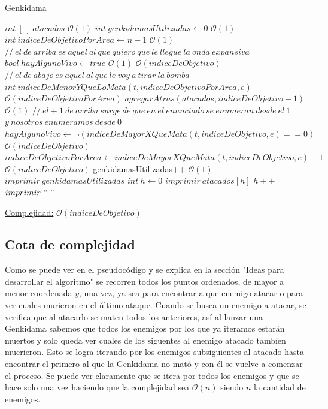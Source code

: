 \documentclass[10pt,a4paper]{article}
\begin{document}
\begin{algorithm}
\caption{Genkidama}
\begin{algorithmic}
  	\State $int~[~]~ atacados$ \Comment $\mathcal{O}(1)$
  	\State $int ~genkidamasUtilizadas \gets 0$ \Comment $\mathcal{O}(1)$
	\State $int ~indiceDeObjetivoPorArea \gets n - 1$ \Comment $\mathcal{O}(1)$
	\State $ //~el~ de~ arriba~ es~ aquel~ al~ que~ quiero~ que~ le~ llegue~ la~ onda~ expansiva$
	\State $bool ~hayAlgunoVivo \gets true$ \Comment $\mathcal{O}(1)$
	 \Comment $\mathcal{O}(indiceDeObjetivo)$
		\State $ 	//~el~ de~ abajo ~es~ aquel~ al~ que~ le~ voy~ a ~tirar~ la~ bomba$
		\State $int~indiceDeMenorYQueLoMata(t, indiceDeObjetivoPorArea, e)$ \Comment $\mathcal{O}(indiceDeObjetivoPorArea)$
		\State $agregarAtras(atacados, indiceDeObjetivo + 1)$ \Comment $\mathcal{O}(1)$
		\State $		//~el +1 ~de~ arriba~ surge~ de~ que~ en~ el~ enunciado ~se~ enumeran~ desde~ el~ 1 ~$
		\State $	   y~ nosotros~ enumeramos~ desde~ 0$
		\State $hayAlgunoVivo \gets \neg(indiceDeMayorXQueMata(t, indiceDeObjetivo, e) == 0)$ \Comment $\mathcal{O}(indiceDeObjetivo)$
		\State $indiceDeObjetivoPorArea \gets indiceDeMayorXQueMata(t, indiceDeObjetivo, e) - 1$ \Comment $\mathcal{O}(indiceDeObjetivo)$
		\State genkidamasUtilizadas++ \Comment $\mathcal{O}(1)$
	\EndWhile
	\State $imprimir ~genkidamasUtilizadas$
	\State $int~ h \gets 0$
			\State $imprimir ~atacados[h]$
			\State $h++$
					\State $imprimir ~"~"~$
			\EndIf
	\EndWhile
\EndFunction
\end{algorithmic}
\underline{Complejidad:} $\mathcal{O}(indiceDeObjetivo)$\\
    
\end{algorithm}

\newpage

\subsection{Cota de complejidad}
Como se puede ver en el pseudocódigo y se explica en la sección "Ideas para desarrollar el algoritmo" se recorren todos los puntos ordenados, de mayor a menor coordenada $y$, una vez, ya sea para encontrar a que enemigo atacar o para ver cuales murieron en el último ataque.
Cuando se busca un enemigo a atacar, se verifica que al atacarlo se maten todos los anteriores, así al lanzar una Genkidama sabemos que todos los enemigos por los que ya iteramos estarán muertos y solo queda ver cuales de los siguentes al enemigo atacado tambíen muerieron. Esto se logra iterando por los enemigos subsiguientes al atacado hasta encontrar el primero al que la Genkidama no mató y con él se vuelve a comenzar el proceso. Se puede ver claramente que se itera por todos los enemigos y que se hace solo una vez haciendo que la complejidad sea $\mathcal{O}(n)$ siendo $n$ la cantidad de enemigos.
\end{document}
